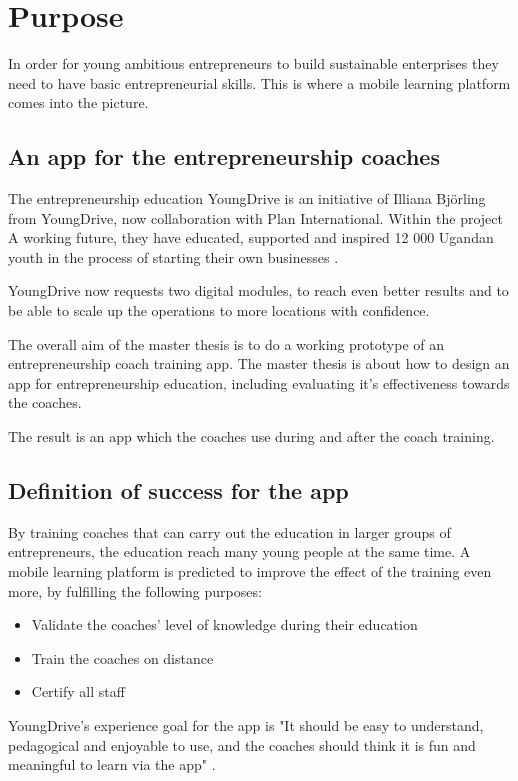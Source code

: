 \section{Purpose}
\label{purpose}

In order for young ambitious entrepreneurs to build sustainable enterprises they need to have basic entrepreneurial skills. This is where a mobile learning platform comes into the picture.

\subsection{An app for the entrepreneurship coaches}
The entrepreneurship education YoungDrive is an initiative of Illiana Björling from YoungDrive, now collaboration with Plan International. Within the project A working future, they have educated, supported and inspired 12 000 Ugandan youth in the process of starting their own businesses \citep{nissar}.

YoungDrive now requests two digital modules, to reach even better results and to be able to scale up the operations to more locations with confidence.

The overall aim of the master thesis is to do a working prototype of an entrepreneurship coach training app. The master thesis is about how to design an app for entrepreneurship education, including evaluating it's effectiveness towards the coaches.

The result is an app which the coaches use during and after the coach training.

\subsection{Definition of success for the app}

By training coaches that can carry out the education in larger groups of entrepreneurs, the education reach many young people at the same time. A mobile learning platform is predicted to improve the effect of the training even more, by fulfilling the following purposes:

\begin{itemize}
  \item Validate the coaches' level of knowledge during their education
    \item Train the coaches on distance
    \item Certify all staff
\end{itemize}

YoungDrive's experience goal for the app is "It should be easy to understand, pedagogical and enjoyable to use, and the coaches should think it is fun and meaningful to learn via the app" \citep{youngdrive-masterthesis-idea}.
